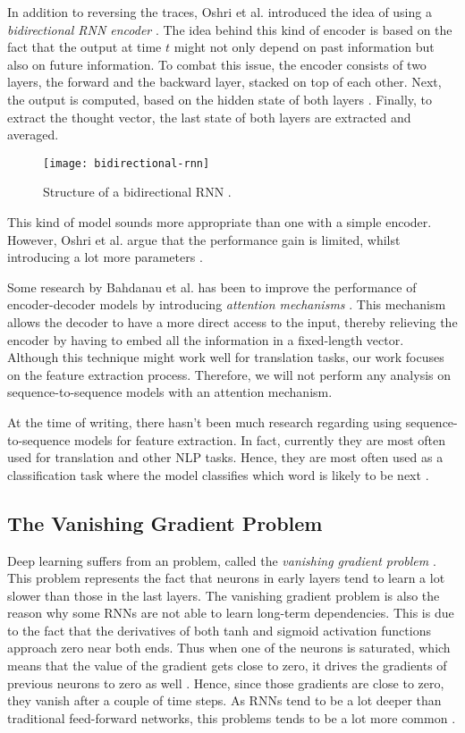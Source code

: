 In addition to reversing the traces, Oshri et al. introduced the idea of using a \textit{bidirectional RNN encoder} \cite{rnnencoder}.
The idea behind this kind of encoder is based on the fact that the output at time $t$ might not only depend on past information but also on future information.
To combat this issue, the encoder consists of two layers, the forward and the backward layer, stacked on top of each other.
Next, the output is computed, based on the hidden state of both layers \cite{britz_2016}.
Finally, to extract the thought vector, the last state of both layers are extracted and averaged.

\begin{figure}[ht]
  \centering
  \texttt{[image: bidirectional-rnn]}
  \caption{Structure of a bidirectional RNN \cite{britz_2016}.}
  \label{fig:bidirectional-rnn}
\end{figure}

This kind of model sounds more appropriate than one with a simple encoder.
However, Oshri et al. argue that the performance gain is limited, whilst introducing a lot more parameters \cite{rnnencoder}.

Some research by Bahdanau et al. has been to improve the performance of encoder-decoder models by introducing \textit{attention mechanisms} \cite{attention_mechanisms}.
This mechanism allows the decoder to have a more direct access to the input, thereby relieving the encoder by having to embed all the information in a fixed-length vector.
Although this technique might work well for translation tasks, our work focuses on the feature extraction process.
Therefore, we will not perform any analysis on sequence-to-sequence models with an attention mechanism.

At the time of writing, there hasn't been much research regarding using sequence-to-sequence models for feature extraction.
In fact, currently they are most often used for translation and other NLP tasks.
Hence, they are most often used as a classification task where the model classifies which word is likely to be next \cite{tensorflowseq2seq,cho2014learning,rnnencoder,sutskever_vinyals_le}.

\subsection{The Vanishing Gradient Problem}

Deep learning suffers from an problem, called the \textit{vanishing gradient problem} \cite{nielsen_2017}.
This problem represents the fact that neurons in early layers tend to learn a lot slower than those in the last layers.
The vanishing gradient problem is also the reason why some RNNs are not able to learn long-term dependencies.
This is due to the fact that the derivatives of both tanh and sigmoid activation functions approach zero near both ends.
Thus when one of the neurons is saturated, which means that the value of the gradient gets close to zero, it drives the gradients of previous neurons to zero as well \cite{britz_2016}.
Hence, since those gradients are close to zero, they vanish after a couple of time steps.
As RNNs tend to be a lot deeper than traditional feed-forward networks, this problems tends to be a lot more common \cite{britz_2016}.

